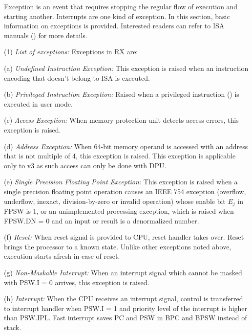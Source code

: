 \SOPNoteBody

Exception is an event that requires stopping the regular flow of execution and starting another. 
Interrupts are one kind of exception. In this section, basic information on exceptions is
provided. Interested readers can refer to ISA manuals 
(\cite{rx_v1_um, rx_v2_um, rx_v3_um}) for more details.

(1) \emph{List of exceptions:} %
Exceptions in RX are: 

    \leveltwo
    (a) \emph{Undefined Instruction Exception:} %
    This exception is raised when an instruction encoding that doesn't belong to ISA is executed.

    (b) \emph{Privileged Instruction Exception:} %
    Raised when a privileged instruction () 
    is executed in user mode.

    (c) \emph{Access Exception:} %
    When memory protection unit detects access errors, this exception is raised.

    (d) \emph{Address Exception:} %
    When 64-bit memory operand is accessed with an address that is not multiple of 4, this 
    exception is raised. This exception is applicable only to v3 as such access can only be
    done with DPU.

    (e) \emph{Single Precision Floating Point Exception:} %
    This exception is raised when a single precision floating point operation causes an IEEE 754 
    exception (overflow, underflow, inexact, division-by-zero or invalid operation) whose enable 
    bit $E_j$ in FPSW is 1, or an unimplemented processing exception, which is raised when FPSW.DN = 0 
    and an input or result is a denormalized number.

    (f) \emph{Reset:} %
    When reset signal is provided to CPU, reset handler takes over. Reset brings the 
    processor to a known state. Unlike other exceptions noted above, execution starts afresh
    in case of reset.

    (g) \emph{Non-Maskable Interrupt:} %
    When an interrupt signal which cannot be masked with PSW.I = 0 arrives, this exception
    is raised.

    (h) \emph{Interrupt:} %
    When the CPU receives an interrupt signal, control is transferred to interrupt handler 
    when PSW.I = 1 and priority level of the interrupt is higher than PSW.IPL. Fast interrupt 
    saves PC and PSW in BPC and BPSW instead of stack.

